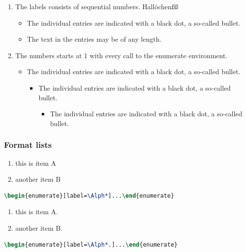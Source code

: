 \documentclass{article}				%
\begin{document}
\begin{enumerate}
	\item The labels consists of sequential numbers. Hallöchenßß
	\begin{itemize}
		\item The individual entries are indicated with a black dot, a so-called bullet.
		\item The text in the entries may be of any length.
	\end{itemize}
	\item The numbers starts at 1 with every call to the enumerate environment.
	\begin{itemize}
		\item The individual entries are indicated with a black dot, a so-called bullet.
		\begin{itemize}
			\item The individual entries are indicated with a black dot, a so-called bullet.
			\begin{itemize}
				\item The individual entries are indicated with a black dot, a so-called bullet.
			\end{itemize}
		\end{itemize}
	\end{itemize}
\end{enumerate}

\subsubsection{Format lists}

\begin{enumerate}[label=\Alph*]
	\item this is item A
	\item another item B
\end{enumerate}

\begin{lstlisting}[language=tex,frame=single]
\begin{enumerate}[label=\Alph*]...\end{enumerate}
\end{lstlisting}

\begin{enumerate}[label=\Alph*.]
	\item this is item A.
	\item another item B.
\end{enumerate}

\begin{lstlisting}[language=tex,frame=single]
\begin{enumerate}[label=\Alph*.]...\end{enumerate}
\end{lstlisting}
\end{document}

